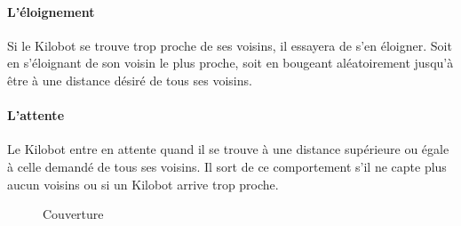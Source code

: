 \documentclass[a4paper]{article}
\begin{document}
\paragraph{L'éloignement} Si le Kilobot se trouve trop proche de ses voisins, il essayera de s'en éloigner. Soit en s'éloignant de son voisin le plus proche, soit en bougeant aléatoirement jusqu'à être à une distance désiré de tous ses voisins.
\paragraph{L'attente} Le Kilobot entre en attente quand il se trouve à une distance supérieure ou égale à celle demandé de tous ses voisins. Il sort de ce comportement s'il ne capte plus aucun voisins ou si un Kilobot arrive trop proche.\\


\begin{figure}[h!]
\centering
{}
\caption{Couverture}
\end{figure}
\newpage
\end{document}
